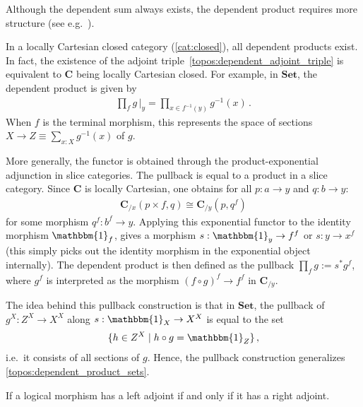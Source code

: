    Although the dependent sum always exists, the dependent product requires more structure (see e.g.~\citet{huang_locally_2022}).
    \begin{property}
        In a locally Cartesian closed category (\cref{cat:closed}), all dependent products exist. In fact, the existence of the adjoint triple~\eqref{topos:dependent_adjoint_triple} is equivalent to $\mathbf{C}$ being locally Cartesian closed. For example, in $\mathbf{Set}$, the dependent product is given by
        \begin{gather}
            \label{topos:dependent_product_sets}
            \prod_fg\,\Big|_y=\prod_{x\in f^{-1}(y)}g^{-1}(x)\,.
        \end{gather}
        When $f$ is the terminal morphism, this represents the space of sections $X\rightarrow Z\equiv\sum_{x:X}g^{-1}(x)$ of $g$.

        More generally, the functor is obtained through the product-exponential adjunction in slice categories. The pullback is equal to a product in a slice category. Since $\mathbf{C}$ is locally Cartesian, one obtains for all $p:a\rightarrow y$ and $q:b\rightarrow y$:
        \begin{gather}
            \mathbf{C}_{/x}(p\times f,q)\cong\mathbf{C}_{/y}(p,q^f)
        \end{gather}
        for some morphism $q^f:b^f\rightarrow y$. Applying this exponential functor to the identity morphism $\mathbbm{1}_f$, gives a morphism $s:\mathbbm{1}_y\rightarrow f^f$ or $s:y\rightarrow x^f$ (this simply picks out the identity morphism in the exponential object internally). The dependent product is then defined as the pullback $\prod_fg:=s^*g^f$, where $g^f$ is interpreted as the morphism $(f\circ g)^f\rightarrow f^f$ in $\mathbf{C}_{/y}$.

        The idea behind this pullback construction is that in $\mathbf{Set}$, the pullback of $g^X:Z^X\rightarrow X^X$ along $s:\mathbbm{1}_X\rightarrow X^X$ is equal to the set
        \begin{gather}
            \{h\in Z^X\mid h\circ g=\mathbbm{1}_Z\}\,,
        \end{gather}
        i.e.~it consists of all sections of $g$. Hence, the pullback construction generalizes \cref{topos:dependent_product_sets}.
    \end{property}

    \begin{property}
        If a logical morphism has a left adjoint if and only if it has a right adjoint.
    \end{property}

